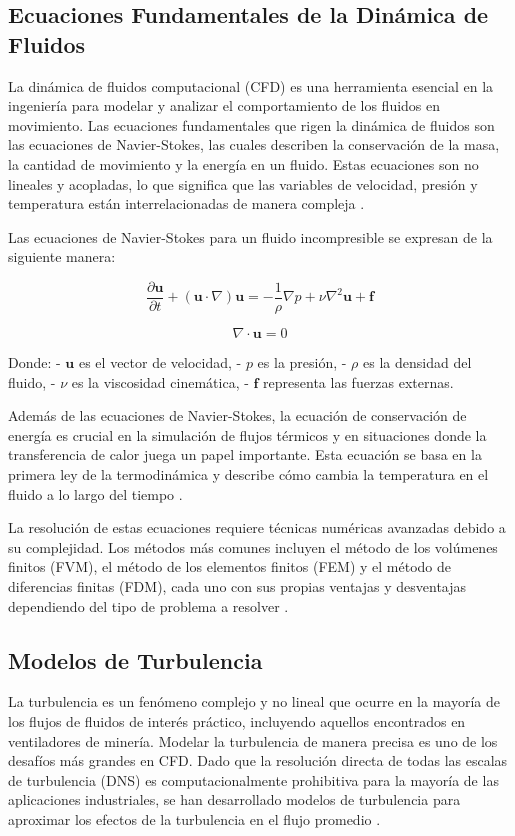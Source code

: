 \subsection{Ecuaciones Fundamentales de la Dinámica de Fluidos}

La dinámica de fluidos computacional (CFD) es una herramienta esencial en la ingeniería para modelar y analizar el comportamiento de los fluidos en movimiento. Las ecuaciones fundamentales que rigen la dinámica de fluidos son las ecuaciones de Navier-Stokes, las cuales describen la conservación de la masa, la cantidad de movimiento y la energía en un fluido. Estas ecuaciones son no lineales y acopladas, lo que significa que las variables de velocidad, presión y temperatura están interrelacionadas de manera compleja \cite{white2006fluid}.

Las ecuaciones de Navier-Stokes para un fluido incompresible se expresan de la siguiente manera:

\[
\frac{\partial \mathbf{u}}{\partial t} + (\mathbf{u} \cdot \nabla)\mathbf{u} = -\frac{1}{\rho} \nabla p + \nu \nabla^2 \mathbf{u} + \mathbf{f}
\]

\[
\nabla \cdot \mathbf{u} = 0
\]

Donde:
- \(\mathbf{u}\) es el vector de velocidad,
- \(p\) es la presión,
- \(\rho\) es la densidad del fluido,
- \(\nu\) es la viscosidad cinemática,
- \(\mathbf{f}\) representa las fuerzas externas.

Además de las ecuaciones de Navier-Stokes, la ecuación de conservación de energía es crucial en la simulación de flujos térmicos y en situaciones donde la transferencia de calor juega un papel importante. Esta ecuación se basa en la primera ley de la termodinámica y describe cómo cambia la temperatura en el fluido a lo largo del tiempo \cite{incropera2007fundamentals}.

La resolución de estas ecuaciones requiere técnicas numéricas avanzadas debido a su complejidad. Los métodos más comunes incluyen el método de los volúmenes finitos (FVM), el método de los elementos finitos (FEM) y el método de diferencias finitas (FDM), cada uno con sus propias ventajas y desventajas dependiendo del tipo de problema a resolver \cite{versteeg2007introduction}.

\subsection{Modelos de Turbulencia}

La turbulencia es un fenómeno complejo y no lineal que ocurre en la mayoría de los flujos de fluidos de interés práctico, incluyendo aquellos encontrados en ventiladores de minería. Modelar la turbulencia de manera precisa es uno de los desafíos más grandes en CFD. Dado que la resolución directa de todas las escalas de turbulencia (DNS) es computacionalmente prohibitiva para la mayoría de las aplicaciones industriales, se han desarrollado modelos de turbulencia para aproximar los efectos de la turbulencia en el flujo promedio \cite{wilcox2006turbulence}.

